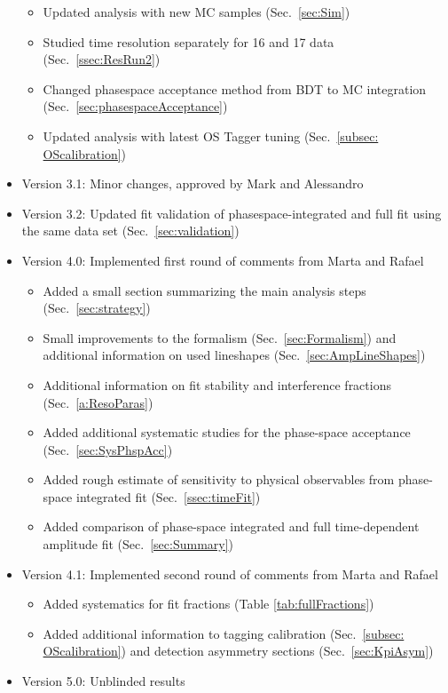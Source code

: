\begin{itemize}
\begin{itemize}
		\item Updated analysis with new MC samples   (Sec.~\ref{sec:Sim})
	
		\item Studied time resolution separately for 16 and 17 data (Sec.~\ref{ssec:ResRun2}) 		
		
		\item Changed phasespace acceptance method from BDT to MC integration (Sec.~\ref{sec:phasespaceAcceptance}) 

		\item Updated analysis with latest OS Tagger tuning   (Sec.~\ref{subsec: OScalibration}) 		
		
	\end{itemize}
	
	\item Version 3.1:   Minor changes, approved by Mark and  Alessandro

	\item Version 3.2:   Updated fit validation of phasespace-integrated and full fit using the same data set (Sec.~\ref{sec:validation})

	\item Version 4.0:   Implemented first round of comments from Marta and Rafael
	\begin{itemize}
		\item Added a small section summarizing the main analysis steps (Sec.~\ref{sec:strategy})
		\item Small improvements to the formalism (Sec.~\ref{sec:Formalism}) and additional information on used lineshapes (Sec.~\ref{sec:AmpLineShapes})
		\item Additional information on fit stability and interference fractions (Sec.~\ref{a:ResoParas})
		\item Added additional systematic studies for the phase-space acceptance (Sec.~\ref{sec:SysPhspAcc})
		\item Added rough estimate of sensitivity to physical observables from phase-space integrated fit  (Sec.~\ref{ssec:timeFit})
		\item Added comparison of phase-space integrated and full time-dependent amplitude fit (Sec.~\ref{sec:Summary})
	\end{itemize}
	
		\item Version 4.1:   Implemented second round of comments from Marta and Rafael
	\begin{itemize}
		\item Added systematics for fit fractions (Table \ref{tab:fullFractions})
		\item Added additional information to tagging calibration (Sec.~\ref{subsec: OScalibration}) and detection asymmetry sections (Sec.~\ref{sec:KpiAsym})
	\end{itemize}
	
			\item Version 5.0:  Unblinded results 


\end{itemize}
